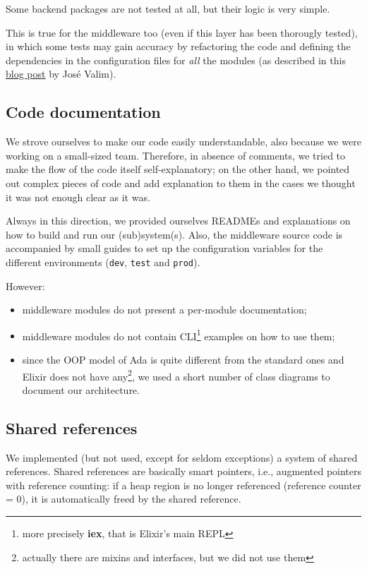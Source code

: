 Some backend packages are not tested at all, but their logic is very simple.

This is true for the middleware too (even if this layer has been thorougly
tested), in which some tests may gain accuracy by refactoring the code and
defining the dependencies in the configuration files for \textit{all} the
modules (as described in this
\href{http://blog.plataformatec.com.br/2015/10/mocks-and-explicit-contracts/}{blog post} by Jos\'e Valim).

\subsection{Code documentation}
We strove ourselves to make our code easily understandable, also because we
were working on a small-sized team.
Therefore, in absence of comments, we tried to make the flow of the code itself
self-explanatory; on the other hand, we pointed out complex pieces of code and
add explanation to them in the cases we thought it was not enough clear as it
was.

Always in this direction, we provided ourselves READMEs and explanations on how
to build and run our (sub)system(s). Also, the middleware source code is
accompanied by small guides to set up the configuration variables for the
different environments (\texttt{dev}, \texttt{test} and \texttt{prod}).

However:
\begin{itemize}
  \item middleware modules do not present a per-module documentation;
  \item middleware modules do not contain CLI\footnote{more precisely
    \textbf{iex}, that is Elixir's main REPL} examples on how to use them;
  \item since the OOP model of Ada is quite different from the standard ones
    and Elixir does not have any\footnote{actually there are mixins and
    interfaces, but we did not use them}, we used a short number of class
    diagrams to document our architecture.
\end{itemize}

\subsection{Shared references}
We implemented (but not used, except for seldom exceptions) a system of shared
references.
Shared references are basically smart pointers, i.e., augmented pointers with
reference counting: if a heap region is no longer referenced (reference counter = 0),
it is automatically freed by the shared reference.

